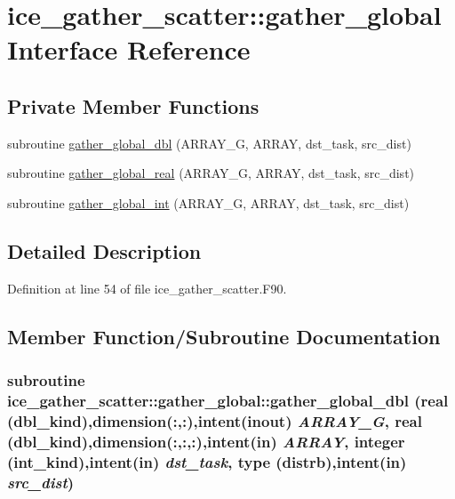 \hypertarget{interfaceice__gather__scatter_1_1gather__global}{
\section{ice\_\-gather\_\-scatter::gather\_\-global Interface Reference}
\label{interfaceice__gather__scatter_1_1gather__global}
}
\subsection*{Private Member Functions}
\begin{DoxyCompactItemize}
\item 
subroutine \hyperlink{interfaceice__gather__scatter_1_1gather__global_a95b1df00014531472f2933f98d5336b7}{gather\_\-global\_\-dbl} (ARRAY\_\-G, ARRAY, dst\_\-task, src\_\-dist)
\item 
subroutine \hyperlink{interfaceice__gather__scatter_1_1gather__global_a8f22e460e948c057cc341222a0224a5f}{gather\_\-global\_\-real} (ARRAY\_\-G, ARRAY, dst\_\-task, src\_\-dist)
\item 
subroutine \hyperlink{interfaceice__gather__scatter_1_1gather__global_a37d71c277551534bbef6485810e646dc}{gather\_\-global\_\-int} (ARRAY\_\-G, ARRAY, dst\_\-task, src\_\-dist)
\end{DoxyCompactItemize}


\subsection{Detailed Description}


Definition at line 54 of file ice\_\-gather\_\-scatter.F90.

\subsection{Member Function/Subroutine Documentation}
\hypertarget{interfaceice__gather__scatter_1_1gather__global_a95b1df00014531472f2933f98d5336b7}{
\subsubsection[{gather\_\-global\_\-dbl}]{\setlength{\rightskip}{0pt plus 5cm}subroutine ice\_\-gather\_\-scatter::gather\_\-global::gather\_\-global\_\-dbl (real (dbl\_\-kind),dimension(:,:),intent(inout) {\em ARRAY\_\-G}, \/  real (dbl\_\-kind),dimension(:,:,:),intent(in) {\em ARRAY}, \/  integer (int\_\-kind),intent(in) {\em dst\_\-task}, \/  type ({\bf distrb}),intent(in) {\em src\_\-dist})}}
\label{interfaceice__gather__scatter_1_1gather__global_a95b1df00014531472f2933f98d5336b7}


